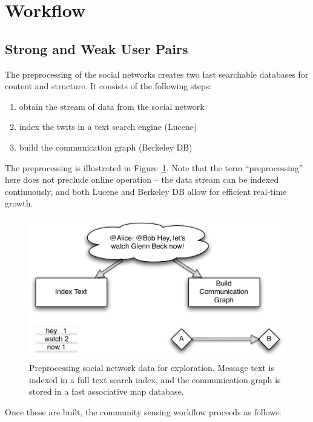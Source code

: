 \section{Workflow}

\subsection{Strong and Weak User Pairs}

The preprocessing of the social networks creates two fast searchable databases for content and structure.  It consists of the following steps:

\begin{enumerate}
	\item obtain the stream of data from the social network
	\item index the twits in a text search engine (Lucene)
	\item build the communication graph (Berkeley DB)
\end{enumerate}

The preprocessing is illustrated in Figure~\ref{figure:preprocessing}.  Note that the term ``preprocessing'' here does not preclude online operation -- the data stream can be indexed continuously, and both Lucene and Berkeley DB allow for efficient real-time growth.

\begin{figure}[htp]
\includegraphics{figures/spie-preprocessing}
\caption{Preprocessing social network data for exploration.  Message text is indexed in a full text search index, and the communication graph is stored in a fast associative map database.}
\label{figure:preprocessing}
\end{figure}


Once those are built, the community sensing workflow proceeds as follows:

